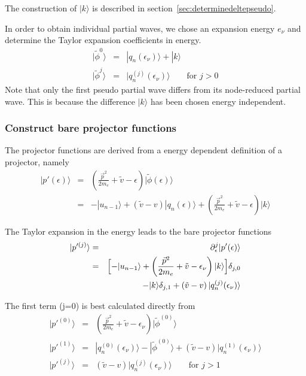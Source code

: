 \documentclass[11pt,a4paper]{report}
\begin{document}
The construction of $|k\rangle$ is described in
section~\ref{sec:determinedeltepseudo}.

In order to obtain individual partial waves, we chose an expansion
energy $e_\nu$ and determine the Taylor expansion coefficients in
energy.
\begin{eqnarray}
|\tilde{\phi}^{0}\rangle&=&|q_n(\epsilon_\nu)\rangle+|k\rangle
\nonumber\\
|\tilde{\phi}^{j}\rangle&=&|q_n^{(j)}(\epsilon_\nu)\rangle
\qquad\text{for $j>0$}
\end{eqnarray}
Note that only the first pseudo partial wave differs from its
node-reduced partial wave. This is because the difference $|k\rangle$
has been chosen energy independent.

\subsubsection{Construct bare projector functions}
The projector functions are derived from a energy dependent definition
of a projector, namely
\begin{eqnarray}
|p'(\epsilon)\rangle&=&
\left(\frac{\vec{p}^2}{2m_e}+\tilde{v}-\epsilon\right)
|\tilde\phi(\epsilon)\rangle
\nonumber\\
&=&-|u_{n-1}\rangle
+\left(\tilde{v}-v\right)|q_n(\epsilon)\rangle
+\left(\frac{\vec{p}^2}{2m_e}+\tilde{v}-\epsilon\right)
|k\rangle
\end{eqnarray}

The Taylor expansion in the energy leads to the bare projector
functions
\begin{eqnarray}
|p'^{(j)}\rangle&=&\partial_\epsilon^j|p'(\epsilon)\rangle
\nonumber\\
&=&
\Bigl[-|u_{n-1}\rangle
+\left(\frac{\vec{p}^2}{2m_e}+\tilde{v}-\epsilon_\nu\right)
|k\rangle\Bigr]\delta_{j,0}
\nonumber\\
&&
-|k\rangle\delta_{j,1}
+\left(\tilde{v}-v\right)|q_n^{(j)}(\epsilon_\nu)\rangle
\end{eqnarray}

The first term (j=0) is best calculated directly from
\begin{eqnarray}
|p'^{(0)}\rangle&=&
\left(\frac{\vec{p}^2}{2m_e}+\tilde{v}-\epsilon_\nu\right)
|\tilde\phi^{(0)}\rangle
\\
|p'^{(1)}\rangle&=&
|q_{n}^{(0)}(\epsilon_\nu)\rangle-|\tilde\phi^{(0)}\rangle
+\left(\tilde{v}-v\right)|q_n^{(1)}(\epsilon_\nu)\rangle
\\
|p'^{(j)}\rangle&=&
\left(\tilde{v}-v\right)|q_n^{(j)}(\epsilon_\nu)\rangle
\qquad\text{for $j>1$}
\end{eqnarray}
\end{document}
